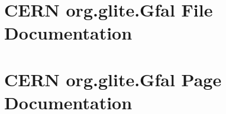 \documentclass[a4paper]{book}
\begin{document}
\chapter{CERN org.glite.Gfal File Documentation}






















\chapter{CERN org.glite.Gfal Page Documentation}


\printindex
\end{document}
